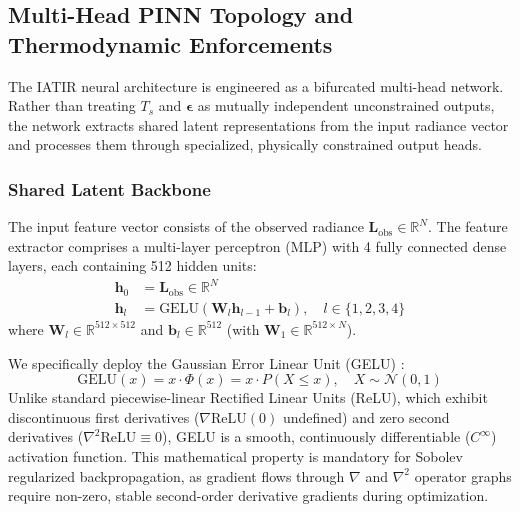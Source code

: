 \documentclass[journal]{IEEEtran}
\begin{document}
\subsection{Multi-Head PINN Topology and Thermodynamic Enforcements}
The IATIR neural architecture is engineered as a bifurcated multi-head network. Rather than treating $T_s$ and $\bm{\epsilon}$ as mutually independent unconstrained outputs, the network extracts shared latent representations from the input radiance vector and processes them through specialized, physically constrained output heads.

\subsubsection{Shared Latent Backbone}
The input feature vector consists of the observed radiance $\bm{L}_{\text{obs}} \in \mathbb{R}^N$. The feature extractor comprises a multi-layer perceptron (MLP) with 4 fully connected dense layers, each containing 512 hidden units:
\begin{align}
\bm{h}_0 &= \bm{L}_{\text{obs}} \in \mathbb{R}^N \\
\bm{h}_l &= \text{GELU}(\bm{W}_l \bm{h}_{l-1} + \bm{b}_l), \quad l \in \{1, 2, 3, 4\}
\end{align}
where $\bm{W}_l \in \mathbb{R}^{512 \times 512}$ and $\bm{b}_l \in \mathbb{R}^{512}$ (with $\bm{W}_1 \in \mathbb{R}^{512 \times N}$).

We specifically deploy the Gaussian Error Linear Unit (GELU) \cite{raissi2019physics}:
\begin{equation}
\text{GELU}(x) = x \cdot \Phi(x) = x \cdot P(X \le x), \quad X \sim \mathcal{N}(0, 1)
\end{equation}
Unlike standard piecewise-linear Rectified Linear Units (ReLU), which exhibit discontinuous first derivatives ($\nabla \text{ReLU}(0)$ undefined) and zero second derivatives ($\nabla^2 \text{ReLU} \equiv 0$), GELU is a smooth, continuously differentiable ($C^\infty$) activation function. This mathematical property is mandatory for Sobolev regularized backpropagation, as gradient flows through $\nabla$ and $\nabla^2$ operator graphs require non-zero, stable second-order derivative gradients during optimization.
\end{document}
